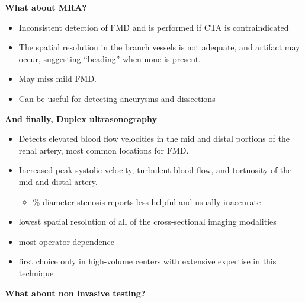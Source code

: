 \documentclass[
]{book}
\providecommand{\tightlist}{%
  \setlength{\itemsep}{0pt}\setlength{\parskip}{0pt}}
\begin{document}
\textbf{What about MRA?}

\begin{itemize}
\item
  Inconsistent detection of FMD and is performed if CTA is
  contraindicated
\item
  The spatial resolution in the branch vessels is not adequate, and
  artifact may occur, suggesting ``beading'' when none is present.
\item
  May miss mild FMD.
\item
  Can be useful for detecting aneurysms and dissections
\end{itemize}

\textbf{And finally, Duplex ultrasonography}

\begin{itemize}
\item
  Detects elevated blood flow velocities in the mid and distal
  portions of the renal artery, most common locations for FMD.
\item
  Increased peak systolic velocity, turbulent blood flow, and
  tortuosity of the mid and distal artery.

  \begin{itemize}
  \tightlist
  \item
    \% diameter stenosis reports less helpful and usually inaccurate
  \end{itemize}
\item
  lowest spatial resolution of all of the cross-sectional imaging
  modalities
\item
  most operator dependence
\item
  first choice only in high-volume centers with extensive expertise in
  this technique
\end{itemize}

\textbf{What about non invasive testing?}
\end{document}
